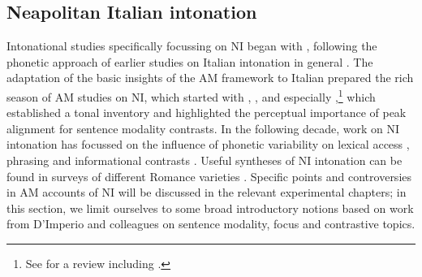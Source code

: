 \subsection{Neapolitan Italian intonation}\label{sec123}
Intonational studies specifically focussing on NI began with \citet{maturi1988intonazione}, following the phonetic approach of earlier studies on Italian intonation in general \citep{magnocaldognetto1978f0}. The adaptation of the basic insights of the AM framework to Italian \citep{avesani1990contribution} prepared the rich season of AM studies on NI, which started with \citet{caputo1994intonazione,caputo1996presupposizione}, \citet{caputo1995possibile}, and especially \citet{dimperio1995timing,dimperio1997narrow,dimperio2001focus,dimperio2003tonal},\footnote{See \citet[§2.1]{dimperio2000role} for a review including \citet{dimperio1996caratteristiche,dimperio1997breadth,dimperio1997perception}.} which established a tonal inventory and highlighted the perceptual importance of peak alignment for sentence modality contrasts. In the following decade, work on NI intonation has focussed on the influence of phonetic variability on lexical access \citep{dimperio2007effects}, phrasing \citep{petrone2008tonal,petrone2011tones,dimperio2011phrasing} and informational contrasts \citep{brunetti2010prosodic}. Useful syntheses of NI intonation can be found in surveys of different Romance varieties \citep{dimperio2002italian,grice2005strategy,prieto2005pitch}. Specific points and controversies in AM accounts of NI will be discussed in the relevant experimental chapters; in this section, we limit ourselves to some broad introductory notions based on work from D'Imperio and colleagues \citep{grice2005strategy,petrone2011tones,dimperio2011phrasing} on sentence modality, focus and contrastive topics.

